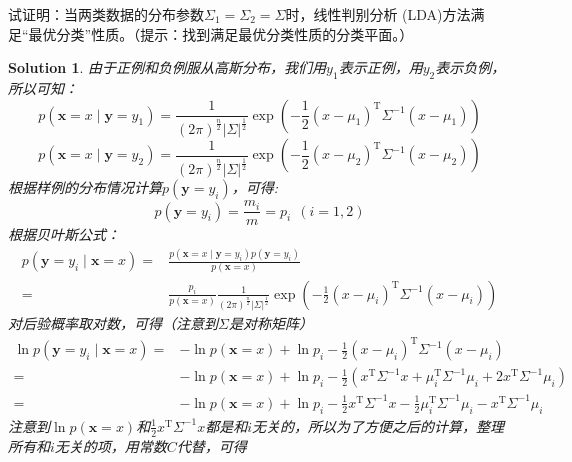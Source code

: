 \documentclass[a4paper,UTF8]{article}
\numberwithin{equation}{section}
\newtheorem*{solution}{Solution}
\begin{document}
试证明：当两类数据的分布参数$\Sigma_1=\Sigma_2=\Sigma$时，线性判别分析 (LDA)方法满足“最优分类”性质。（提示：找到满足最优分类性质的分类平面。）
\begin{solution}
由于正例和负例服从高斯分布，我们用$y_1$表示正例，用$y_2$表示负例，所以可知：\\
\begin{equation}
p(\mathbf{x} = x \mid \mathbf{y} = y_1) = \frac{1}{(2\pi)^{\frac{n}{2}}\lvert \Sigma \rvert^{\frac{1}{2}}}\exp(-\frac{1}{2}(x - \mu_1)^\mathrm{T}\Sigma^{-1}(x - \mu_1)
)
\end{equation}
\begin{equation}
p(\mathbf{x} = x \mid \mathbf{y} = y_2) = \frac{1}{(2\pi)^{\frac{n}{2}}\lvert \Sigma \rvert^{\frac{1}{2}}}\exp(-\frac{1}{2}(x - \mu_2)^\mathrm{T}\Sigma^{-1}(x - \mu_2)
)
\end{equation}
根据样例的分布情况计算$p(\mathbf{y}=y_i)$，可得:
\begin{equation}
p(\mathbf{y}=y_i) = \frac{m_i}{m} = p_i\ \ (i = 1, 2)
\end{equation}
根据贝叶斯公式：
\begin{equation}
\begin{aligned}
p(\mathbf{y} = y_i \mid  \mathbf{x} = x) 
=& \frac{p(\mathbf{x} = x \mid \mathbf{y} = y_i)p(\mathbf{y} = y_i)}{p(\mathbf{x} = x)} \\
=& \frac{p_i}{p(\mathbf{x} = x)}\frac{1}{(2\pi)^{\frac{n}{2}}\lvert \Sigma \rvert^{\frac{1}{2}}}\exp(-\frac{1}{2}(x - \mu_i)^\mathrm{T}\Sigma^{-1}(x - \mu_i))
\end{aligned}
\end{equation}
对后验概率取对数，可得（注意到$\Sigma$是对称矩阵）
\begin{equation}
\begin{aligned}
\ln p(\mathbf{y} = y_i \mid  \mathbf{x} = x) 
=& -\ln p(\mathbf{x} = x) + \ln p_i - \frac{1}{2}(x - \mu_i)^\mathrm{T}\Sigma^{-1}(x - \mu_i)\\
=& -\ln p(\mathbf{x} = x) + \ln p_i - \frac{1}{2}(x^\mathrm{T}\Sigma^{-1}x + \mu_i^\mathrm{T}\Sigma^{-1}\mu_i + 2x^{\mathrm{T}}\Sigma^{-1}\mu_i)\\
=& -\ln p(\mathbf{x} = x) + \ln p_i - \frac{1}{2}x^\mathrm{T}\Sigma^{-1}x - \frac{1}{2} \mu_i^\mathrm{T}\Sigma^{-1}\mu_i - x^{\mathrm{T}}\Sigma^{-1}\mu_i
\end{aligned}
\end{equation}
注意到$\ln p(\mathbf{x} = x)$和$\frac{1}{2}x^\mathrm{T}\Sigma^{-1}x$都是和$i$无关的，所以为了方便之后的计算，整理所有和$i$无关的项，用常数$C$代替，可得

\end{solution}
\end{document}
